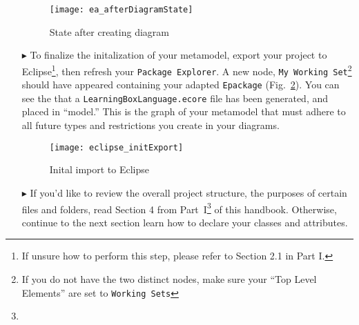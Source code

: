 \begin{itemize}
\begin{figure}[htbp]
	\centering
  \texttt{[image: ea\_afterDiagramState]}
	\caption{State after creating diagram}
	\label{fig:diagram_completed}
\end{figure}
\FloatBarrier

\newpage

\item[$\blacktriangleright$] To finalize the initalization of your metamodel, export your project to Eclipse\footnote{If unsure how to perform this step, please
refer to Section 2.1 in Part I.}, then refresh your \texttt{Package Explorer}. A new node, \texttt{My Working Set}\footnote{If you do not have the two distinct
nodes, make sure your ``Top Level Elements'' are set to \texttt{Working Sets}} should have appeared containing your adapted \texttt{Epackage}
(Fig.~\ref{fig:init_import}). You can see the that a \texttt{LearningBoxLanguage.ecore} file has been generated, and placed in ``model.'' This is the graph of
your metamodel that must adhere to all future types and restrictions you create in your diagrams.

\vspace{0.5cm}

\begin{figure}[htbp]
	\centering
  \texttt{[image: eclipse\_initExport]}
	\caption{Inital import to Eclipse}
	\label{fig:init_import}
\end{figure}
\FloatBarrier

\vspace{0.5cm}

\item[$\blacktriangleright$] If you'd like to review the overall project structure, the purposes of certain files and folders, read Section 4 from
Part~I\footnote{\downLink} of this handbook. Otherwise, continue to the next section learn how to declare your classes and attributes.

\end{itemize}
